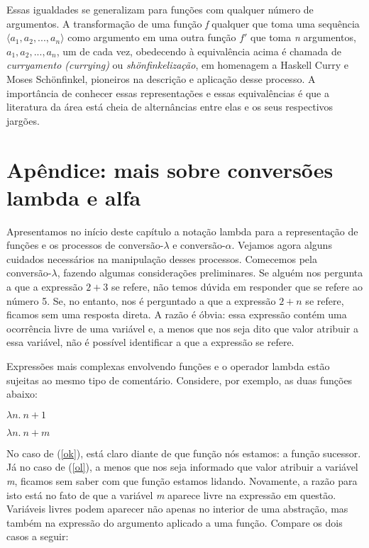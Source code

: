 \n Essas igualdades se generalizam para funções com qualquer número de argumentos. A transformação de uma função \textit{f} qualquer que toma uma sequência $\langle a_{1}, a_{2},...,a_{n}\rangle$ como argumento em uma outra
função $f'$ que toma \textit{n} argumentos, $a_{1},
a_{2},...,a_{n}$, um de cada vez, obedecendo à equivalência acima é chamada de \textit{curryamento (currying)} ou \textit{shönfinkelização}, em homenagem a Haskell Curry e Moses Schönfinkel, pioneiros na descrição e aplicação desse processo. A importância de conhecer essas representações e essas equivalências é que a literatura da área está cheia de alternâncias entre elas e os seus respectivos jargões.


\section*{Apêndice: mais sobre conversões lambda e alfa}

Apresentamos no início deste capítulo a notação lambda para a representação de funções e os processos de conversão-$\lambda$ e conversão-$\alpha$. Vejamos agora alguns cuidados necessários na manipulação desses
processos. Comecemos pela conversão-$\lambda$, fazendo  algumas
considerações preliminares. Se alguém nos pergunta a que a
expressão $2+3$ se refere, não temos dúvida em responder que se
refere ao número 5. Se, no entanto, nos é perguntado a que a
expressão $2+n$ se refere, ficamos sem uma resposta direta. A
razão é óbvia: essa expressão contém uma ocorrência livre de
uma variável e, a menos que nos seja dito que valor atribuir a
essa variável, não é possível identificar a que a expressão se
refere.

Expressões mais complexas envolvendo funções e o operador
lambda estão sujeitas ao mesmo tipo de comentário. Considere,
por exemplo, as duas funções abaixo:

\begin{exe}
	\ex $\lambda n.\ n+1$ \label{ok}
\end{exe}

\begin{exe}
	\ex $\lambda n.\ n+m$ \label{ol}
\end{exe}

\n No caso de (\ref{ok}), está claro diante de que função nós
estamos: a função sucessor. Já no caso de (\ref{ol}), a menos
que nos seja informado que valor atribuir a variável \textit{m},
ficamos sem saber com que função estamos lidando. Novamente, a
razão para isto está no fato de que a variável \textit{m} aparece
livre na expressão em questão. Variáveis livres podem aparecer não
apenas no interior de uma abstração, mas também na expressão do
argumento aplicado a uma função. Compare os dois casos a seguir:

